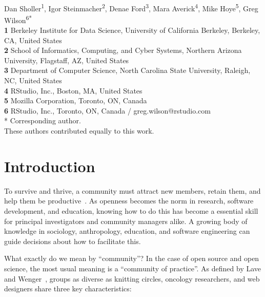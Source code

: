 \documentclass[10pt,letterpaper]{article}
\date{}
\begin{document}
\vspace*{0.2in}

\begin{flushleft}
{\Large
\textbf{}
}
\newline
\\
{Dan Sholler}\textsuperscript{1{\ddag}},
{Igor Steinmacher}\textsuperscript{2{\ddag}},
{Denae Ford}\textsuperscript{3{\ddag}},
{Mara Averick}\textsuperscript{4{\ddag}},
{Mike Hoye}\textsuperscript{5{\ddag}},
{Greg Wilson}\textsuperscript{6{\ddag}*}
\\
\bigskip
\textbf{1} Berkeley Institute for Data Science, University of California Berkeley, Berkeley, CA, United States\\
\textbf{2} School of Informatics, Computing, and Cyber Systems, Northern Arizona University, Flagstaff, AZ, United States\\
\textbf{3} Department of Computer Science, North Carolina State University, Raleigh, NC, United States\\
\textbf{4} RStudio, Inc., Boston, MA, United States\\
\textbf{5} Mozilla Corporation, Toronto, ON, Canada\\
\textbf{6} RStudio, Inc., Toronto, ON, Canada / greg.wilson@rstudio.com \\
* Corresponding author. \\
\bigskip
{\ddag} These authors contributed equally to this work.
\end{flushleft}

\section*{Introduction}

To survive and thrive,
a community must attract new members,
retain them,
and help them be productive~\cite{qureshi2011}.
As openness becomes the norm in research, software development, and education,
knowing how to do this has become a essential skill
for principal investigators and community managers alike.
A growing body of knowledge in sociology, anthropology, education, and software engineering
can guide decisions about how to facilitate this.

What exactly do we mean by ``community''?
In the case of open source and open science,
the most usual meaning is a ``community of practice''.
As defined by Lave and Wenger~\cite{lave1991,wenger1999},
groups as diverse as knitting circles, oncology researchers, and web designers
share three key characteristics:
\end{document}
